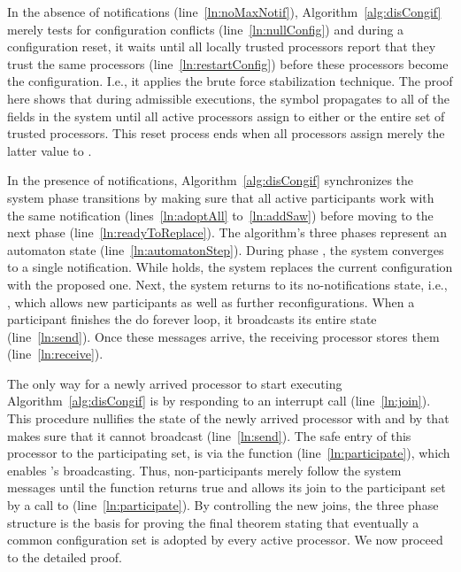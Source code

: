 \documentclass[11pt]{article}
\begin{document}
In the absence of notifications (line~\ref{ln:noMaxNotif}), 
Algorithm~\ref{alg:disCongif} merely tests for configuration conflicts (line~\ref{ln:nullConfig}) and during a configuration reset, it waits until all locally trusted processors report that they trust the same processors (line~\ref{ln:restartConfig}) before these processors become the configuration. I.e., it applies the brute force stabilization technique. The proof here shows that during admissible executions, the  symbol propagates to all of the  fields in the system until all active processors assign to  either  or the entire set of trusted processors. 
This reset process ends when all processors assign merely the latter value to .


In the presence of notifications, Algorithm~\ref{alg:disCongif}  synchronizes the system phase transitions by making sure that all active participants work with the same notification (lines~\ref{ln:adoptAll} to~\ref{ln:addSaw}) before moving to the next phase (line~\ref{ln:readyToReplace}). The algorithm's three phases represent an automaton state (line~\ref{ln:automatonStep}). 
During phase , the system converges to a single notification. While  holds, the system replaces the current configuration with the proposed one. Next, the system returns to its no-notifications state, i.e., , which allows new participants as well as further reconfigurations. 
When a participant finishes the do forever loop, it broadcasts its entire state (line~\ref{ln:send}).
Once these messages arrive, the receiving processor stores them (line~\ref{ln:receive}). 

The only way for a newly arrived processor to start executing Algorithm~\ref{alg:disCongif} is by responding to an interrupt call (line~\ref{ln:join}). This procedure nullifies the state of the newly arrived processor with  and by that makes sure that it cannot broadcast (line~\ref{ln:send}). The safe entry of this processor to the participating set, is via the function  (line~\ref{ln:participate}), which enables 's broadcasting. Thus, non-participants merely follow the system messages until the function  returns true and allows its join to the participant set by a call to  (line~\ref{ln:participate}). 
By controlling the new joins, the three phase structure is the basis for proving the final theorem stating that eventually a common configuration set is adopted by every active processor. We now proceed to the detailed proof.
\end{document}
